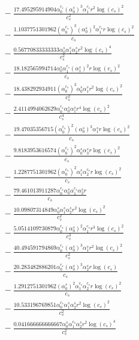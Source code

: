 \documentclass[10pt]{article}
\begin{document}
\begin{align*}
&{}  - \frac{17.495295914904 \alpha_{0}^{c_s} \left(\alpha_{0}^s\right)^{3} \alpha_{1}^{c_s} r^{2} \log{\left(c_{s} \right)}^{2}}{c_{s}^{2}} \\
&{}  - \frac{1.1037751301962 \left(\alpha_{0}^{c_s}\right)^{3} \left(\alpha_{0}^s\right)^{2} \alpha_{1}^{c_s} r \log{\left(c_{s} \right)}^{2}}{c_{s}} \\
&{}  - \frac{0.56770833333333 \alpha_{0}^s \alpha_{1}^s \alpha_{2}^s r^{2} \log{\left(c_{s} \right)}^{4}}{c_{s}^{2}} \\
&{}  - \frac{18.182565994714 \alpha_{0}^s \alpha_{1}^{c_s} \left(\alpha_{1}^s\right)^{2} r \log{\left(c_{s} \right)}^{2}}{c_{s}} \\
&{}  - \frac{18.438292934911 \left(\alpha_{0}^{c_s}\right)^{3} \alpha_{0}^s \alpha_{1}^s r^{2} \log{\left(c_{s} \right)}^{2}}{c_{s}^{2}} \\
&{}  - \frac{2.4114994062629 \alpha_{0}^{c_s} \alpha_{0}^s \alpha_{1}^s r^{4} \log{\left(c_{s} \right)}^{2}}{c_{s}^{4}} \\
&{}  - \frac{19.47035356715 \left(\alpha_{0}^{c_s}\right)^{2} \left(\alpha_{0}^s\right)^{3} \alpha_{1}^s r \log{\left(c_{s} \right)}^{2}}{c_{s}} \\
&{}  - \frac{9.8183953616574 \left(\alpha_{0}^{c_s}\right)^{2} \alpha_{0}^s \alpha_{3}^s r \log{\left(c_{s} \right)}^{2}}{c_{s}} \\
&{}  - \frac{1.2287751301962 \left(\alpha_{0}^{c_s}\right)^{2} \alpha_{1}^s \alpha_{2}^{c_s} r \log{\left(c_{s} \right)}^{2}}{c_{s}} \\
&{}  - \frac{79.461013911287 \alpha_{0}^{c_s} \alpha_{0}^s \alpha_{1}^{c_s} \alpha_{2}^s r}{c_{s}} \\
&{}  - \frac{10.09807314849 \alpha_{0}^s \alpha_{1}^s \alpha_{2}^s r^{2} \log{\left(c_{s} \right)}^{2}}{c_{s}^{2}} \\
&{}  - \frac{5.0514109730879 \alpha_{0}^{c_s} \left(\alpha_{0}^s\right)^{2} \alpha_{1}^{c_s} r^{3} \log{\left(c_{s} \right)}^{2}}{c_{s}^{3}} \\
&{}  - \frac{40.494591794869 \alpha_{0}^{c_s} \left(\alpha_{0}^s\right)^{3} \alpha_{1}^s r^{2} \log{\left(c_{s} \right)}^{2}}{c_{s}^{2}} \\
&{}  - \frac{20.283482886201 \alpha_{0}^{c_s} \left(\alpha_{0}^s\right)^{3} \alpha_{2}^s r \log{\left(c_{s} \right)}}{c_{s}} \\
&{}  - \frac{1.2912751301962 \left(\alpha_{0}^s\right)^{2} \alpha_{1}^{c_s} \alpha_{2}^{c_s} r \log{\left(c_{s} \right)}^{2}}{c_{s}} \\
&{}  - \frac{10.533196769851 \alpha_{0}^{c_s} \alpha_{1}^s \alpha_{2}^s r^{2} \log{\left(c_{s} \right)}^{2}}{c_{s}^{2}} \\
&{}  - \frac{0.041666666666667 \alpha_{0}^s \alpha_{1}^{c_s} \alpha_{2}^s r^{2} \log{\left(c_{s} \right)}^{4}}{c_{s}^{2}}
\end{align*}
\end{document}
